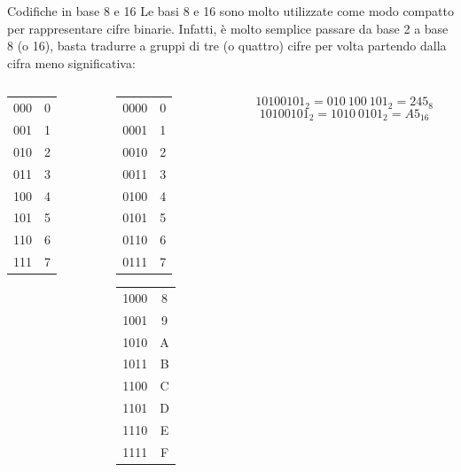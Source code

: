 \documentclass[aspectratio=169, ]{beamer}
\begin{document}
\begin{frame}{Codifiche in base 8 e 16}
Le basi 8 e 16 sono molto utilizzate come modo compatto per rappresentare cifre binarie.
Infatti, è molto semplice passare da base 2 a base 8 (o 16), basta tradurre a gruppi di tre (o quattro) cifre per volta partendo dalla cifra meno significativa:

\pause
    \vspace{.5cm}
\begin{columns}
    \begin{column}{0.1\textwidth}
        \begin{tabular}{c|c}
            000 & 0 \\
            001 & 1 \\
            010 & 2 \\
            011 & 3 \\
            100 & 4 \\
            101 & 5 \\
            110	& 6	\\
            111 & 7 \\
        \end{tabular}
    \end{column}
    \pause
    \begin{column}{0.3\textwidth}
        \begin{tabular}{c|c}
            0000 & 0 \\
            0001 & 1 \\
            0010 & 2 \\
            0011 & 3 \\
            0100 & 4 \\
            0101 & 5 \\
            0110 & 6 \\
            0111 & 7 \\
        \end{tabular}
        \begin{tabular}{c|c}
            1000 & 8 \\
            1001 & 9 \\
            1010 & A \\
            1011 & B \\
            1100 & C \\
            1101 & D \\
            1110 & E \\
            1111 & F \\
        \end{tabular}
    \end{column}
    \begin{column}{0.5\textwidth}

        \[10100101_2 = 010\ 100\ 101_2 = 245_8 \]
        \[10100101_2 = 1010\ 0101_2 = A5_{16} \]
    \end{column}
\end{columns}
\end{frame}
\end{document}
